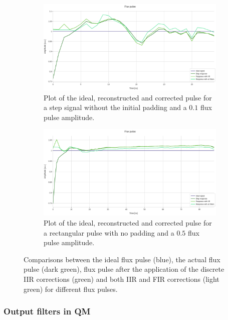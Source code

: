 \begin{figure}[h!]
    \centering
    \begin{subfigure}[t]{0.495\textwidth}
        \includegraphics[width=\textwidth]{figures/png/Cryoscope/step_nice.png}
        \caption{Plot of the ideal, reconstructed and corrected pulse for a step signal without the initial padding and a $0.1$ flux pulse amplitude.}
        \label{fig:nice:nopad}
    \end{subfigure}
    \hfill
    \begin{subfigure}[t]{0.495\textwidth}
        \includegraphics[width=\textwidth]{figures/png/Cryoscope/long_nice.png}
        \caption{Plot of the ideal, reconstructed and corrected pulse for a rectangular pulse with no padding and a $0.5$ flux pulse amplitude.}
        \label{fig:nice:long}
    \end{subfigure}
    \caption{Comparisons between the ideal flux pulse (blue), the actual flux pulse (dark green), flux pulse after the application of the discrete IIR corrections (green) and both IIR and FIR corrections (light green) for different flux pulses.}
    \label{fig:nice}
\end{figure}

\subsubsection{Output filters in QM}

